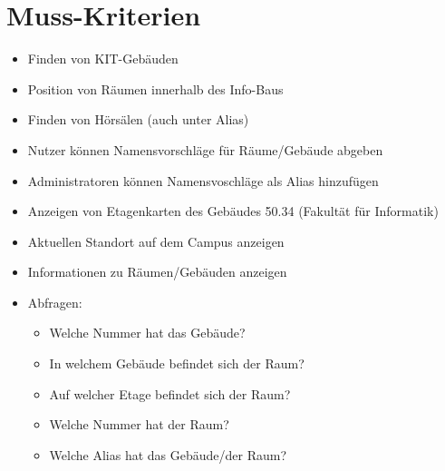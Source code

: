 \section{Muss-Kriterien}

\begin{itemize}

    \item Finden von KIT-Gebäuden
    \item Position von Räumen innerhalb des Info-Baus
    \item Finden von Hörsälen (auch unter Alias)
    \item Nutzer können Namensvorschläge für Räume/Gebäude abgeben
    \item Administratoren können Namensvoschläge als Alias hinzufügen
    \item Anzeigen von Etagenkarten des Gebäudes 50.34 (Fakultät für Informatik)
    \item Aktuellen Standort auf dem Campus anzeigen
    \item Informationen zu Räumen/Gebäuden anzeigen
    \item Abfragen:
        \begin{itemize}
            \item Welche Nummer hat das Gebäude?
            \item In welchem Gebäude befindet sich der Raum?
            \item Auf welcher Etage befindet sich der Raum?
            \item Welche Nummer hat der Raum?
            \item Welche Alias hat das Gebäude/der Raum?
        \end{itemize}


\end{itemize}
